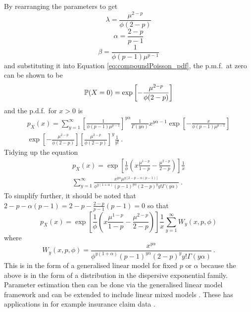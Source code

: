 By rearranging the parameters to get
\begin{equation}
  \lambda=\frac{\mu^{2-p}}{\phi(2-p)}
\end{equation}
\begin{equation}
  \alpha=\frac{2-p}{p-1}
\end{equation}
\begin{equation}
  \beta=\frac{1}{\phi(p-1)\mu^{p-1}}
\end{equation}
and substituting it into Equation \eqref{eq:compoundPoisson_pdf}, the p.m.f.~at zero can be shown to be
\begin{equation}
  \operatorname{\mathbb{P}}(X=0) = \exp
  \left[
      -\frac{\mu^{2-p}}{\phi(2-p)}
  \right]
\end{equation}
and the p.d.f.~for $x>0$ is
\begin{multline}
  p_X(x) = \sum_{y=1}^{\infty}
  \left[
    \frac{1}{\phi(p-1)\mu^{p-1}}
  \right]^{y\alpha}
  \frac{1}{\Gamma(y\alpha)}
  x^{y\alpha-1}
  \exp\left[
      -\frac{x}{\phi(p-1)\mu^{p-1}}
  \right]
  \\
  \exp\left[
      -\frac{\mu^{2-p}}{\phi(2-p)}
  \right]
  \left[
    \frac{\mu^{2-p}}{\phi(2-p)}
  \right]^y
  \frac{1}{y!}
  \ .
\end{multline}
Tidying up the equation
\begin{multline}
  p_X(x) = 
  \exp\left[
    \frac{1}{\phi}\left(x\frac{\mu^{1-p}}{1-p}-\frac{\mu^{2-p}}{2-p}\right)
  \right]
  \frac{1}{x}
  \\
  \sum_{y=1}^{\infty}\frac{x^{y\alpha}\mu^{y[2-p-\alpha(p-1)]}}{\phi^{y(1+\alpha)}(p-1)^{y\alpha}(2-p)^yy!\Gamma(y\alpha)}
  \ .
\end{multline}
To simplify further, it should be noted that $2-p-\alpha(p-1) = 2-p - \frac{2-p}{p-1}(p-1) =0$ so that
\begin{equation}
  p_X(x) = 
  \exp\left[
    \frac{1}{\phi}
    \left(
      x\frac{\mu^{1-p}}{1-p}-\frac{\mu^{2-p}}{2-p}
    \right)
  \right]
  \frac{1}{x}
  \sum_{y=1}^{\infty}W_y(x,p,\phi)
\end{equation}
where
\begin{equation}
  W_y(x,p,\phi)=\frac{x^{y\alpha}}{\phi^{y(1+\alpha)}(p-1)^{y\alpha}(2-p)^yy!\Gamma(y\alpha)}
  \ .
\end{equation}
This is in the form of a generalised linear model \citep{nelder1972generalized, nelder1972generalized_2, mccullagh1984generalized} for fixed $p$ or $\alpha$ because the above is in the form of a distribution in the dispersive exponential family. Parameter estimation then can be done via the generalised linear model framework and can be extended to include linear mixed models \citep{zhang2013likelihood}. These has applications in for example insurance claim data \citep{jorgensen1994fitting, smyth2002fitting}.

